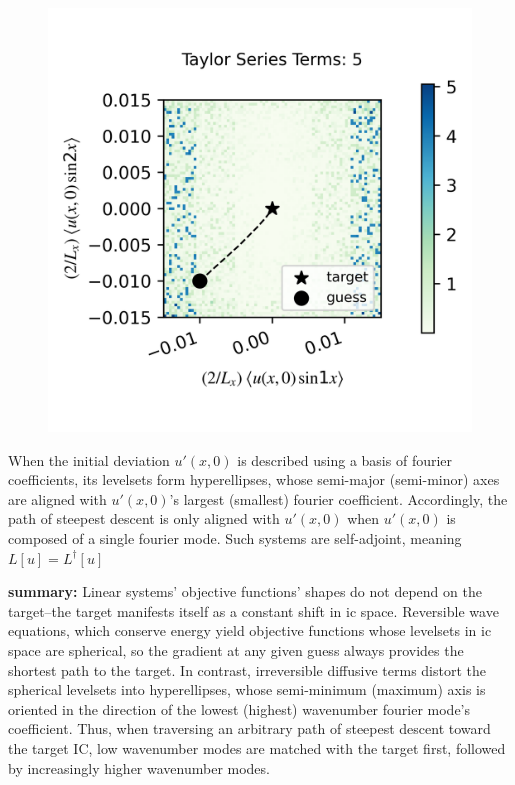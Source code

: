 \documentclass[longbibliography,amsmath,amssymb,aps,nofootinbib]{revtex4-2}
\begin{document}
\begin{figure}[h]
  \centering
  \includegraphics[width=4.5in]{SPHRtest_Nts5a0p3b0p0c0p0T1p0R0p015kt10p0kt20.png}
\end{figure}

\clearpage
When the initial deviation $u'(x, 0)$ is described using a basis of fourier coefficients, its levelsets form hyperellipses, whose semi-major (semi-minor) axes are aligned with $u'(x, 0)$'s largest (smallest) fourier coefficient.
Accordingly, the path of steepest descent is only aligned with $u'(x, 0)$ when $u'(x, 0)$ is composed of a single fourier mode. Such systems are self-adjoint, meaning $L[u] = L^{\dagger}[u]$

\textbf{summary: }Linear systems' objective functions' shapes do not depend on the target--the target manifests itself as a constant shift in ic space. 
Reversible wave equations, which conserve energy yield objective functions whose levelsets in ic space are spherical, so the gradient at any given guess always provides the shortest path to the target. 
In contrast, irreversible diffusive terms distort the spherical levelsets into hyperellipses, whose semi-minimum (maximum) axis is oriented in the direction of the lowest (highest) wavenumber fourier mode's coefficient.
Thus, when traversing an arbitrary path of steepest descent toward the target IC, low wavenumber modes are matched with the target first, followed by increasingly higher wavenumber modes.
\clearpage
\end{document}

